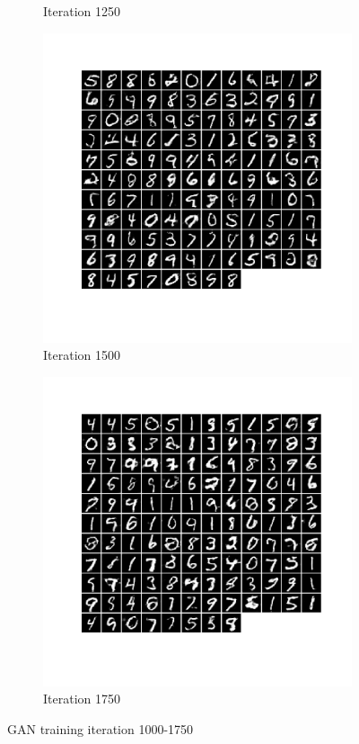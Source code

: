 \documentclass[12pt]{article}
\begin{document}
\begin{figure}[htbp]
\begin{subfigure}[t]{0.48\textwidth}
        \caption{Iteration 1250}
    \label{hw3p4f}
    \end{subfigure}
    \begin{subfigure}[t]{0.48\textwidth}
        \centering
        \includegraphics[trim={1in 2in 1in 0in},scale=0.3]{./Homework3/output/gan/6.png}
        \caption{Iteration 1500}
    \label{hw3p4g}
    \end{subfigure}
    \begin{subfigure}[t]{0.48\textwidth}
        \centering
        \includegraphics[trim={1in 2in 1in 0in},scale=0.3]{./Homework3/output/gan/7.png}
        \caption{Iteration 1750}
    \label{hw3p4h}
    \end{subfigure}
    \caption{GAN training iteration 1000-1750}
\end{figure}
\end{document}
